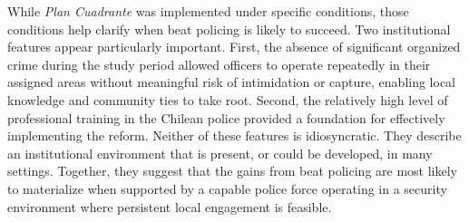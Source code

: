 While \emph{Plan Cuadrante} was implemented under specific conditions, those conditions help clarify when beat policing is likely to succeed. Two institutional features appear particularly important. First, the absence of significant organized crime during the study period allowed officers to operate repeatedly in their assigned areas without meaningful risk of intimidation or capture, enabling local knowledge and community ties to take root. Second, the relatively high level of professional training in the Chilean police provided a foundation for effectively implementing the reform. Neither of these features is idiosyncratic. They describe an institutional environment that is present, or could be developed, in many settings. Together, they suggest that the gains from beat policing are most likely to materialize when supported by a capable police force operating in a security environment where persistent local engagement is feasible.